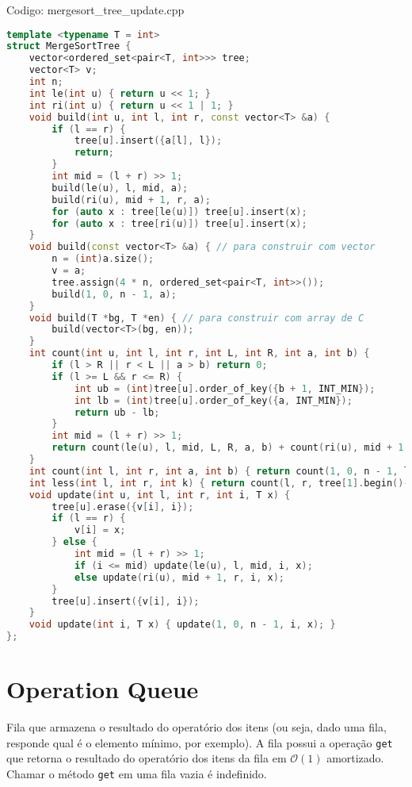 \documentclass[10pt, a4paper, oneside]{book}
\begin{document}
Codigo: mergesort\_tree\_update.cpp

\begin{lstlisting}[language=C++]
template <typename T = int>
struct MergeSortTree {
    vector<ordered_set<pair<T, int>>> tree;
    vector<T> v;
    int n;
    int le(int u) { return u << 1; }
    int ri(int u) { return u << 1 | 1; }
    void build(int u, int l, int r, const vector<T> &a) {
        if (l == r) {
            tree[u].insert({a[l], l});
            return;
        }
        int mid = (l + r) >> 1;
        build(le(u), l, mid, a);
        build(ri(u), mid + 1, r, a);
        for (auto x : tree[le(u)]) tree[u].insert(x);
        for (auto x : tree[ri(u)]) tree[u].insert(x);
    }
    void build(const vector<T> &a) { // para construir com vector
        n = (int)a.size();
        v = a;
        tree.assign(4 * n, ordered_set<pair<T, int>>());
        build(1, 0, n - 1, a);
    }
    void build(T *bg, T *en) { // para construir com array de C
        build(vector<T>(bg, en));
    }
    int count(int u, int l, int r, int L, int R, int a, int b) {
        if (l > R || r < L || a > b) return 0;
        if (l >= L && r <= R) {
            int ub = (int)tree[u].order_of_key({b + 1, INT_MIN});
            int lb = (int)tree[u].order_of_key({a, INT_MIN});
            return ub - lb;
        }
        int mid = (l + r) >> 1;
        return count(le(u), l, mid, L, R, a, b) + count(ri(u), mid + 1, r, L, R, a, b);
    }
    int count(int l, int r, int a, int b) { return count(1, 0, n - 1, l, r, a, b); }
    int less(int l, int r, int k) { return count(l, r, tree[1].begin()->first, k - 1); }
    void update(int u, int l, int r, int i, T x) {
        tree[u].erase({v[i], i});
        if (l == r) {
            v[i] = x;
        } else {
            int mid = (l + r) >> 1;
            if (i <= mid) update(le(u), l, mid, i, x);
            else update(ri(u), mid + 1, r, i, x);
        }
        tree[u].insert({v[i], i});
    }
    void update(int i, T x) { update(1, 0, n - 1, i, x); }
};
\end{lstlisting}
\hfill

\section{Operation Queue}


Fila que armazena o resultado do operatório dos itens (ou seja, dado uma fila, responde qual é o elemento mínimo, por exemplo). A fila possui a operação \texttt{get} que retorna o resultado do operatório dos itens da fila em $\mathcal{O}(1)$ amortizado. Chamar o método \texttt{get} em uma fila vazia é indefinido.
\end{document}
